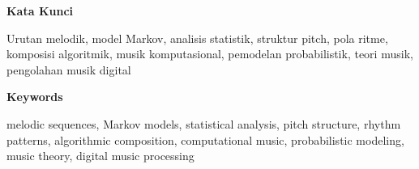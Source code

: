 
\begin{center}
    {\textbf{Kata Kunci}}\par
    \vspace{0.3cm}
\end{center}

\noindent Urutan melodik, model Markov, analisis statistik, struktur pitch, pola ritme, komposisi algoritmik, musik komputasional, pemodelan probabilistik, teori musik, pengolahan musik digital

\vspace{0.5cm}

\begin{center}
    {\textbf{Keywords}}\par
    \vspace{0.3cm}
\end{center}

\noindent melodic sequences, Markov models, statistical analysis, pitch structure, rhythm patterns, algorithmic composition, computational music, probabilistic modeling, music theory, digital music processing